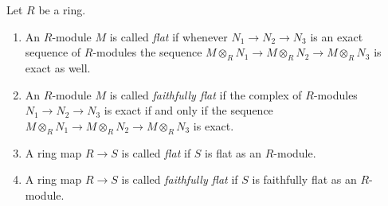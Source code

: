 \begin{definition}
\label{definition-flat}
Let $R$ be a ring.
\begin{enumerate}
\item An $R$-module $M$ is called {\it flat} if whenever
$N_1 \to N_2 \to N_3$ is an exact sequence of $R$-modules
the sequence $M \otimes_R N_1 \to M \otimes_R N_2 \to M \otimes_R N_3$
is exact as well.
\item An $R$-module $M$ is called {\it faithfully flat} if the
complex of $R$-modules
$N_1 \to N_2 \to N_3$ is exact if and only if
the sequence $M \otimes_R N_1 \to M \otimes_R N_2 \to M \otimes_R N_3$
is exact.
\item A ring map $R \to S$ is called {\it flat} if
$S$ is flat as an $R$-module.
\item A ring map $R \to S$ is called {\it faithfully flat} if
$S$ is faithfully flat as an $R$-module.
\end{enumerate}
\end{definition}